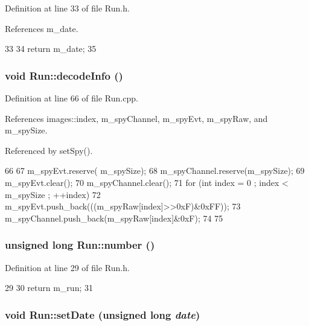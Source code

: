 Definition at line 33 of file Run.h.

References m\_\-date.


\begin{DoxyCode}
33                       {
34     return m_date;
35   }  
\end{DoxyCode}
\hypertarget{classRun_a2b2687a21cbe4b0b528bdb802a0ee585}{
\subsubsection[{decodeInfo}]{\setlength{\rightskip}{0pt plus 5cm}void Run::decodeInfo ()}}
\label{classRun_a2b2687a21cbe4b0b528bdb802a0ee585}


Definition at line 66 of file Run.cpp.

References images::index, m\_\-spyChannel, m\_\-spyEvt, m\_\-spyRaw, and m\_\-spySize.

Referenced by setSpy().


\begin{DoxyCode}
66                      {
67   m_spyEvt.reserve( m_spySize);
68   m_spyChannel.reserve(m_spySize);
69   m_spyEvt.clear();
70   m_spyChannel.clear();
71   for (int index = 0 ; index < m_spySize ; ++index){
72     m_spyEvt.push_back(((m_spyRaw[index]>>0xF)&0xFF));
73     m_spyChannel.push_back(m_spyRaw[index]&0xF);
74   }
75 }
\end{DoxyCode}
\hypertarget{classRun_aab2f7571f6348643011d538d05200f46}{
\subsubsection[{number}]{\setlength{\rightskip}{0pt plus 5cm}unsigned long Run::number ()}}
\label{classRun_aab2f7571f6348643011d538d05200f46}


Definition at line 29 of file Run.h.


\begin{DoxyCode}
29                         {
30     return m_run;
31   }
\end{DoxyCode}
\hypertarget{classRun_ad6c534e3fdce5978250ca04791934680}{
\subsubsection[{setDate}]{\setlength{\rightskip}{0pt plus 5cm}void Run::setDate (unsigned long {\em date})}}
\label{classRun_ad6c534e3fdce5978250ca04791934680}


